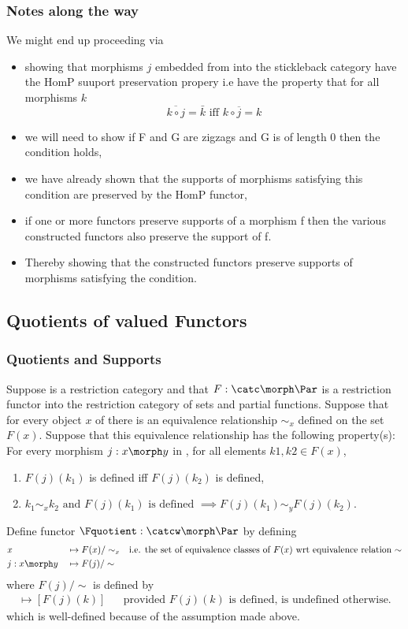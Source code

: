 \subsubsection{Notes along the way}
\begin{worktt}
We might end up proceeding via
\begin{itemize}

\item showing that morphisms $j$ embedded from \catcw into the stickleback category  have the HomP suuport preservation propery
i.e have the property that for all morphisms $k$ 
\[
\overline{k \circ j} = \bar{k} \mbox{ iff } k \circ \overline{j} = k
\]
\item
 we will need to show if F and G are zigzags and G is of length 0 then 
the  condition holds,
\item we have already shown  that the supports of  morphisms satisfying this condition
are preserved by the HomP functor,
\item if one or more functors preserve supports of a morphism f then the various constructed functors also preserve the support of f.
\item Thereby showing that the constructed functors preserve supports of morphisms
satisfying the condition.
 \end{itemize} 
 \end{worktt}


\subsection{Quotients of \Par valued  Functors}
\subsubsection{Quotients and Supports}
Suppose \catcw is a restriction category and that $F: \catc \morph \Par$ is a restriction functor into the restriction category of sets and partial functions. Suppose that for every object $x$ of \catcw there is an equivalence relationship $\sim_x$ defined on the set $F(x)$. Suppose that this equivalence relationship has the following property(s):
For every morphism $j:x \morph y$ in \catcw, for all elements $k1,k2 \in F(x)$,
\begin{enumerate}
\item $F(j)(k_1)$ is defined iff $F(j)(k_2)$ is defined, 
\item $k_1 \sim_x k_2 \mbox{ and } F(j)(k_1) \mbox{ is defined } \implies F(j)(k_1) \sim_y F(j)(k_2).$
\end{enumerate}
Define functor $\Fquotient: \catcw \morph \Par$ by defining
\begin{align*}
&x             &&\mapsto F(x)/\sim_x 
                & \mbox{i.e. the set of equivalence classes of $F(x)$ wrt equivalence relation $\sim$}\\
&j: x \morph y &&\mapsto F(j)/\sim
\end{align*} 
where $F(j)/\sim$ is defined by
\begin{align*}
[k] \mapsto [F(j)(k)] && \mbox{provided $F(j)(k)$ is defined, is undefined otherwise.}
\end{align*}
which is well-defined because of the assumption made above.

